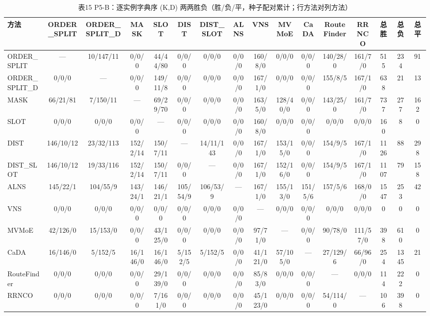\begin{table}[htbp]
\centering
\caption{表15 P5-B：逐实例字典序 (K,D) 两两胜负（胜/负/平，种子配对累计；行方法对列方法）}
\label{tab:p5_15}
\begin{tabular}{lccccccccccccccc}
\toprule
方法 & ORDER_SPLIT & ORDER_SPLIT_D & MASK & SLOT & DIST & DIST_SLOT & ALNS & VNS & MVMoE & CaDA & RouteFinder & RRNCO & 总胜 & 总负 & 总平 \\
\midrule
ORDER_SPLIT & — & 10/147/11 & 0/0/0 & 44/44/80 & 0/0/0 & 0/0/0 & 0/0/0 & 160/8/0 & 0/0/0 & 0/0/0 & 140/28/0 & 161/7/0 & 515 & 234 & 91 \\
ORDER_SPLIT_D & 0/0/0 & — & 0/0/0 & 149/11/8 & 0/0/0 & 0/0/0 & 0/0/0 & 167/1/0 & 0/0/0 & 0/0/0 & 155/8/5 & 167/1/0 & 638 & 21 & 13 \\
MASK & 66/21/81 & 7/150/11 & — & 69/29/70 & 0/0/0 & 0/0/0 & 0/0/0 & 163/5/0 & 128/40/0 & 0/0/0 & 143/25/0 & 161/7/0 & 737 & 277 & 162 \\
SLOT & 0/0/0 & 0/0/0 & 0/0/0 & — & 0/0/0 & 0/0/0 & 0/0/0 & 160/8/0 & 0/0/0 & 0/0/0 & 0/0/0 & 0/0/0 & 160 & 8 & 0 \\
DIST & 146/10/12 & 23/32/113 & 152/2/14 & 150/7/11 & — & 14/11/143 & 0/0/0 & 167/1/0 & 153/15/0 & 0/0/0 & 154/9/5 & 167/1/0 & 1126 & 88 & 298 \\
DIST_SLOT & 146/10/12 & 19/33/116 & 152/2/14 & 150/7/11 & 0/0/0 & — & 0/0/0 & 167/1/0 & 152/16/0 & 0/0/0 & 154/9/5 & 167/1/0 & 1107 & 79 & 158 \\
ALNS & 145/22/1 & 104/55/9 & 143/24/1 & 146/21/1 & 105/54/9 & 106/53/9 & — & 167/1/0 & 155/13/0 & 151/5/6 & 157/5/6 & 168/0/0 & 1547 & 253 & 42 \\
VNS & 0/0/0 & 0/0/0 & 0/0/0 & 0/0/0 & 0/0/0 & 0/0/0 & 0/0/0 & — & 0/0/0 & 0/0/0 & 0/0/0 & 0/0/0 & 0 & 0 & 0 \\
MVMoE & 42/126/0 & 15/153/0 & 0/0/0 & 43/125/0 & 0/0/0 & 0/0/0 & 0/0/0 & 97/71/0 & — & 0/0/0 & 90/78/0 & 111/57/0 & 398 & 610 & 0 \\
CaDA & 16/146/0 & 5/152/5 & 16/146/0 & 16/146/0 & 5/152/5 & 5/152/5 & 0/0/0 & 41/121/0 & 57/105/0 & — & 27/129/6 & 66/96/0 & 254 & 1345 & 21 \\
RouteFinder & 0/0/0 & 0/0/0 & 0/0/0 & 29/139/0 & 0/0/0 & 0/0/0 & 0/0/0 & 85/83/0 & 0/0/0 & 0/0/0 & — & 0/0/0 & 114 & 222 & 0 \\
RRNCO & 0/0/0 & 0/0/0 & 0/0/0 & 7/161/0 & 0/0/0 & 0/0/0 & 0/0/0 & 45/123/0 & 0/0/0 & 0/0/0 & 54/114/0 & — & 106 & 398 & 0 \\
\bottomrule
\end{tabular}
\end{table}
